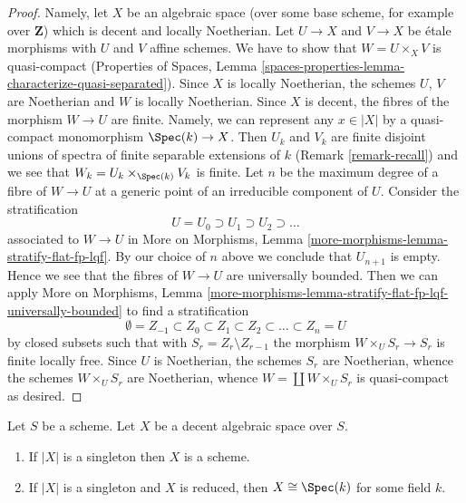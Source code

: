 \begin{proof}
Namely, let $X$ be an algebraic space (over some base scheme, for
example over $\mathbf{Z}$) which is decent and locally Noetherian.
Let $U \to X$ and $V \to X$ be \'etale morphisms with $U$ and $V$
affine schemes. We have to show that $W = U \times_X V$ is quasi-compact
(Properties of Spaces, Lemma
\ref{spaces-properties-lemma-characterize-quasi-separated}).
Since $X$ is locally Noetherian, the schemes $U$, $V$ are Noetherian
and $W$ is locally Noetherian. Since $X$ is decent, the fibres
of the morphism $W \to U$ are finite. Namely, we can represent
any $x \in |X|$ by a quasi-compact monomorphism $\Spec(k) \to X$.
Then $U_k$ and $V_k$ are finite disjoint unions of spectra of
finite separable extensions of $k$ (Remark \ref{remark-recall})
and we see that $W_k = U_k \times_{\Spec(k)} V_k$ is finite.
Let $n$ be the maximum degree of a fibre of $W \to U$ at a generic
point of an irreducible component of $U$. Consider the stratification
$$
U = U_0 \supset U_1 \supset U_2 \supset \ldots
$$
associated to $W \to U$ in
More on Morphisms, Lemma \ref{more-morphisms-lemma-stratify-flat-fp-lqf}.
By our choice of $n$ above we conclude that $U_{n + 1}$ is empty.
Hence we see that the fibres of $W \to U$ are universally bounded.
Then we can apply More on Morphisms, Lemma
\ref{more-morphisms-lemma-stratify-flat-fp-lqf-universally-bounded}
to find a stratification
$$
\emptyset = Z_{-1} \subset Z_0 \subset Z_1 \subset Z_2 \subset
\ldots \subset Z_n = U
$$
by closed subsets such that with $S_r = Z_r \setminus Z_{r - 1}$
the morphism $W \times_U S_r \to S_r$ is finite locally free.
Since $U$ is Noetherian, the schemes $S_r$ are Noetherian,
whence the schemes $W \times_U S_r$ are Noetherian, whence
$W = \coprod W \times_U S_r$ is quasi-compact as desired.
\end{proof}

\begin{lemma}
\label{lemma-when-field}
Let $S$ be a scheme. Let $X$ be a decent algebraic space over $S$.
\begin{enumerate}
\item If $|X|$ is a singleton then $X$ is a scheme.
\item If $|X|$ is a singleton and $X$ is reduced, then
$X \cong \Spec(k)$ for some field $k$.
\end{enumerate}
\end{lemma}

